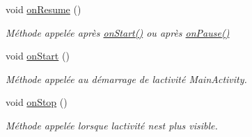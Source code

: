 \begin{DoxyCompactItemize}
void \hyperlink{classcom_1_1lasalle_1_1meeting_1_1_i_h_m_meeting_af9a99a4aa01c58f7d85e0d6e6d13eaa4}{on\+Resume} ()
\begin{DoxyCompactList}\small\item\em Méthode appelée après \hyperlink{classcom_1_1lasalle_1_1meeting_1_1_i_h_m_meeting_a55bd9ed1bd85ada8c53930fb1650a954}{on\+Start()} ou après \hyperlink{classcom_1_1lasalle_1_1meeting_1_1_i_h_m_meeting_a1663a4b9bcff059ab95a72ca019cffb1}{on\+Pause()} \end{DoxyCompactList}\item 
void \hyperlink{classcom_1_1lasalle_1_1meeting_1_1_i_h_m_meeting_a55bd9ed1bd85ada8c53930fb1650a954}{on\+Start} ()
\begin{DoxyCompactList}\small\item\em Méthode appelée au démarrage de l\textquotesingle{}activité Main\+Activity. \end{DoxyCompactList}\item 
void \hyperlink{classcom_1_1lasalle_1_1meeting_1_1_i_h_m_meeting_a74e6b3e48ce9a26612916194d4692e6a}{on\+Stop} ()
\begin{DoxyCompactList}\small\item\em Méthode appelée lorsque l\textquotesingle{}activité n\textquotesingle{}est plus visible. \end{DoxyCompactList}\end{DoxyCompactItemize}
